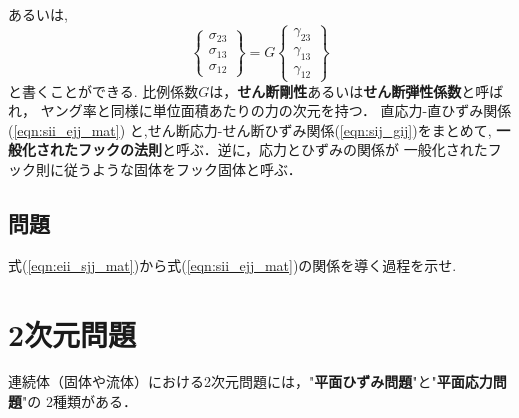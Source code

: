 \documentclass[10pt,a4j]{jarticle}
\begin{document}
あるいは,
\begin{equation}
	\left\{ 
		\begin{array}{*{20}{c}}
		\sigma_{23}\\
		\sigma_{13}\\
		\sigma_{12}
		\end{array}
	\right\} 
	=
	G
	\left\{
		\begin{array}{*{20}{c}}
		\gamma_{23}\\
		\gamma_{13}\\
		\gamma_{12}
		\end{array}
	\right\}
	\label{eqn:sij_gij}
\end{equation}
と書くことができる.
比例係数$G$は，{\bf せん断剛性}あるいは{\bf せん断弾性係数}と呼ばれ，
ヤング率と同様に単位面積あたりの力の次元を持つ．
直応力-直ひずみ関係(\ref{eqn:sii_ejj_mat})
と,せん断応力-せん断ひずみ関係(\ref{eqn:sij_gij})をまとめて,
{\bf 一般化されたフックの法則}と呼ぶ．逆に，応力とひずみの関係が
一般化されたフック則に従うような固体をフック固体と呼ぶ．
\subsection{問題}
式(\ref{eqn:eii_sjj_mat})から式(\ref{eqn:sii_ejj_mat})の関係を導く過程を示せ. 
\section{2次元問題}
連続体（固体や流体）における2次元問題には，"{\bf 平面ひずみ問題}"と"{\bf 平面応力問題}"の
2種類がある．
\end{document}
